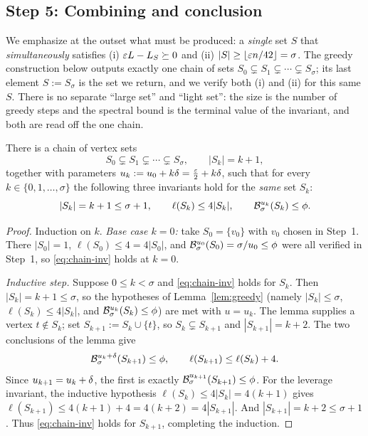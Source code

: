 \subsection*{Step 5: Combining and conclusion}

We emphasize at the outset what must be produced: a \emph{single} set $S$ that
\emph{simultaneously} satisfies (i) $\varepsilon L-L_S\succeq0$ and
(ii) $|S|\ge\lfloor\varepsilon n/42\rfloor=\sigma$. The greedy construction below
outputs exactly one chain of sets $S_0\subsetneq S_1\subsetneq\cdots\subsetneq
S_\sigma$; its last element $S:=S_\sigma$ is the set we return, and we verify both
(i) and (ii) for this same $S$. There is no separate ``large set'' and ``light
set'': the size is the number of greedy steps and the spectral bound is the
terminal value of the invariant, and both are read off the one chain.

\begin{qsixproposition}\label{prop:chain}
There is a chain of vertex sets
\[
  S_0\subsetneq S_1\subsetneq\cdots\subsetneq S_\sigma,
  \qquad |S_k|=k+1,
\]
together with parameters $u_k:=u_0+k\delta=\tfrac{\varepsilon}{2}+k\delta$, such that for
every $k\in\{0,1,\dots,\sigma\}$ the following three invariants hold for the
\emph{same} set $S_k$:
\begin{equation}\label{eq:chain-inv}
  |S_k|=k+1\le\sigma+1,\qquad
  \ell(S_k)\le 4|S_k|,\qquad
  \mathcal{B}^{u_k}_{\sigma}(S_k)\le\phi .
\end{equation}
\end{qsixproposition}

\begin{proof}
Induction on $k$. \emph{Base case $k=0$:} take $S_0=\{v_0\}$ with $v_0$ chosen in
Step~1. There $|S_0|=1$, $\ell(S_0)\le4=4|S_0|$, and
$\mathcal{B}^{u_0}_{\sigma}(S_0)=\sigma/u_0\le\phi$ were all verified in Step~1, so
\eqref{eq:chain-inv} holds at $k=0$.

\emph{Inductive step.} Suppose $0\le k<\sigma$ and \eqref{eq:chain-inv} holds for
$S_k$. Then $|S_k|=k+1\le\sigma$, so the hypotheses of Lemma~\ref{lem:greedy}
(namely $|S_k|\le\sigma$, $\ell(S_k)\le4|S_k|$, and
$\mathcal{B}^{u_k}_{\sigma}(S_k)\le\phi$) are met with $u=u_k$. The lemma supplies a
vertex $t\notin S_k$; set $S_{k+1}:=S_k\cup\{t\}$, so $S_k\subsetneq S_{k+1}$ and
$|S_{k+1}|=k+2$. The two conclusions of the lemma give
\[
  \mathcal{B}^{u_k+\delta}_{\sigma}(S_{k+1})\le\phi,
  \qquad
  \ell(S_{k+1})\le\ell(S_k)+4 .
\]
Since $u_{k+1}=u_k+\delta$, the first is exactly
$\mathcal{B}^{u_{k+1}}_{\sigma}(S_{k+1})\le\phi$. For the leverage invariant, the
inductive hypothesis $\ell(S_k)\le4|S_k|=4(k+1)$ gives
$\ell(S_{k+1})\le4(k+1)+4=4(k+2)=4|S_{k+1}|$. And $|S_{k+1}|=k+2\le\sigma+1$.
Thus \eqref{eq:chain-inv} holds for $S_{k+1}$, completing the induction.
\end{proof}

